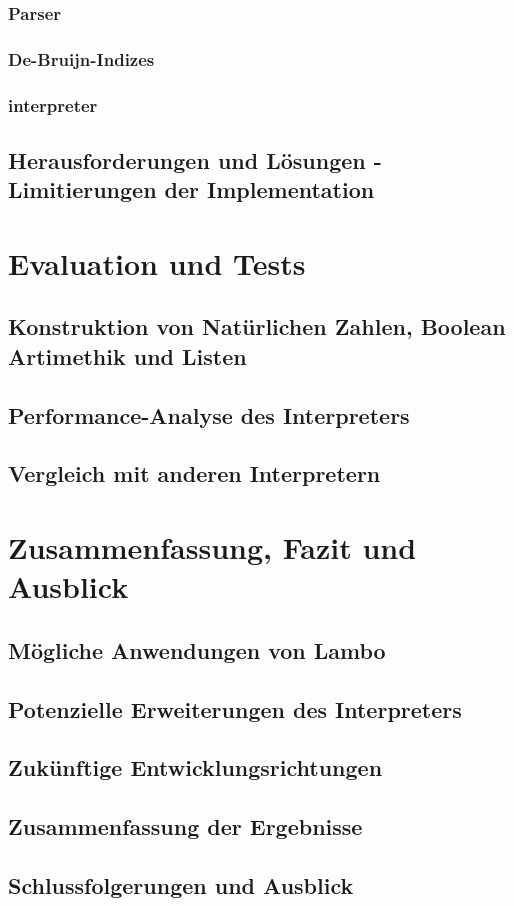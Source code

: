 \documentclass{article}
\begin{document}
\subsubsection{Parser}

\subsubsection{De-Bruijn-Indizes}

\subsubsection{interpreter}

\subsection{Herausforderungen und Lösungen - Limitierungen der Implementation}


\section{Evaluation und Tests}

\subsection{Konstruktion von Natürlichen Zahlen, Boolean Artimethik und Listen}

\subsection{Performance-Analyse des Interpreters}

\subsection{Vergleich mit anderen Interpretern}


\section{Zusammenfassung, Fazit und Ausblick}

\subsection{Mögliche Anwendungen von Lambo}

\subsection{Potenzielle Erweiterungen des Interpreters}

\subsection{Zukünftige Entwicklungsrichtungen}

\subsection{Zusammenfassung der Ergebnisse}

\subsection{Schlussfolgerungen und Ausblick}

\end{document}

